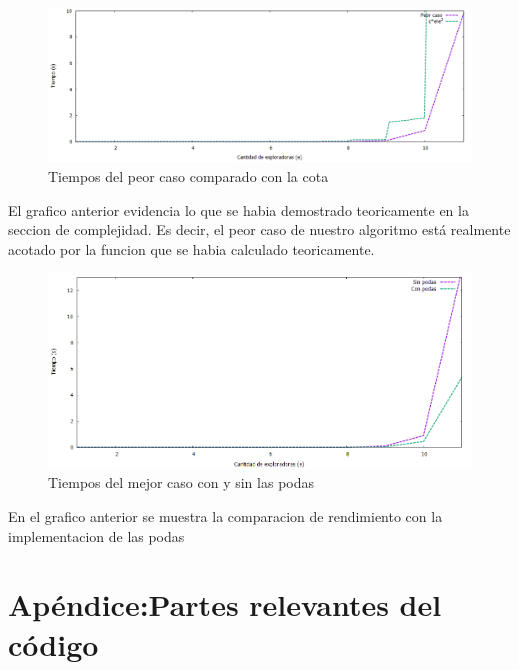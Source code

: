 \documentclass[10pt, a4paper]{article}
\begin{document}
	\begin{figure}[H]
  		\centering
   	 	\includegraphics[width=1\textwidth]
   	 	{Imagenes/exploradorasCotaPropia.png}
		\caption{Tiempos del peor caso comparado con la cota}
	\end{figure}
	
	El grafico anterior evidencia lo que se habia demostrado teoricamente en la seccion de complejidad. Es decir, el peor caso de nuestro algoritmo está realmente acotado por la funcion que se habia calculado teoricamente.
		\begin{figure}[H]
  		\centering
   	 	\includegraphics[width=1\textwidth]
   	 	{Imagenes/exploradorasPodas.png}
		\caption{Tiempos del mejor caso con y sin las podas}
	\end{figure}
	
	En el grafico anterior se muestra la comparacion de rendimiento con la implementacion de las podas
	
\section{Apéndice:Partes relevantes del código}
\end{document}
